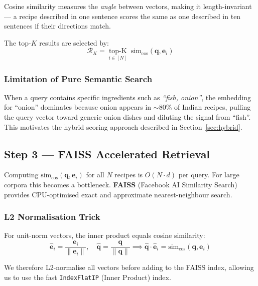 \documentclass[12pt,a4paper]{article}
\begin{document}
Cosine similarity measures the \emph{angle} between vectors, making it
length-invariant — a recipe described in one sentence scores the same as one
described in ten sentences if their directions match.

The top-$K$ results are selected by:
\begin{equation}
  \mathcal{R}_K = \underset{i \in [N]}{\operatorname{top-K}}\;
  \text{sim}_{\cos}(\mathbf{q}, \mathbf{e}_i)
\end{equation}

\subsubsection{Limitation of Pure Semantic Search}

When a query contains specific ingredients such as \textit{``fish, onion''},
the embedding for ``onion'' dominates because onion appears in $\sim$80\% of
Indian recipes, pulling the query vector toward generic onion dishes and
diluting the signal from ``fish''. This motivates the hybrid scoring approach
described in Section~\ref{sec:hybrid}.

\subsection{Step 3 — FAISS Accelerated Retrieval}
\label{sec:faiss}

Computing $\text{sim}_{\cos}(\mathbf{q}, \mathbf{e}_i)$ for all $N$ recipes is
$O(N \cdot d)$ per query. For large corpora this becomes a bottleneck.
\textbf{FAISS} (Facebook AI Similarity Search) provides
CPU-optimised exact and approximate nearest-neighbour search.

\subsubsection{L2 Normalisation Trick}

For unit-norm vectors, the inner product equals cosine similarity:
\begin{equation}
  \hat{\mathbf{e}}_i = \frac{\mathbf{e}_i}{\|\mathbf{e}_i\|}, \quad
  \hat{\mathbf{q}} = \frac{\mathbf{q}}{\|\mathbf{q}\|}
  \implies
  \hat{\mathbf{q}} \cdot \hat{\mathbf{e}}_i = \text{sim}_{\cos}(\mathbf{q}, \mathbf{e}_i)
\end{equation}

We therefore L2-normalise all vectors before adding to the FAISS index, allowing
us to use the fast \texttt{IndexFlatIP} (Inner Product) index.
\end{document}
